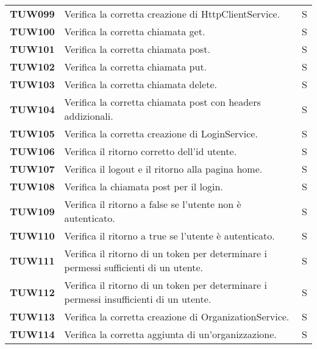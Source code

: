 \documentclass[../../piano-di-qualifica.tex]{subfiles}
\begin{document}
\begin{longtable}[H]{>{\centering\bfseries}m{3cm} >{}m{10cm} >{\centering\arraybackslash}m{3cm}}
TUW099             & Verifica la corretta creazione di HttpClientService. & S \\

TUW100             & Verifica la corretta chiamata get. & S \\

TUW101             & Verifica la corretta chiamata post. & S \\

TUW102             & Verifica la corretta chiamata put. & S \\

TUW103             & Verifica la corretta chiamata delete. & S \\

TUW104             & Verifica la corretta chiamata post con headers addizionali. & S \\


TUW105             & Verifica la corretta creazione di LoginService. & S \\

TUW106             & Verifica il ritorno corretto dell'id utente. & S \\

TUW107             & Verifica il logout e il ritorno alla pagina home. & S \\

TUW108             & Verifica la chiamata post per il login. & S \\

TUW109             & Verifica il ritorno a false se l'utente non è autenticato. & S \\

TUW110             & Verifica il ritorno a true se l'utente è autenticato. & S \\

TUW111             & Verifica il ritorno di un token per determinare i permessi sufficienti di un utente. & S \\

TUW112             & Verifica il ritorno di un token per determinare i permessi insufficienti di un utente. & S \\



TUW113             & Verifica la corretta creazione di OrganizationService. & S \\

TUW114             & Verifica la corretta aggiunta di un'organizzazione. & S \\


\end{longtable}
\end{document}
